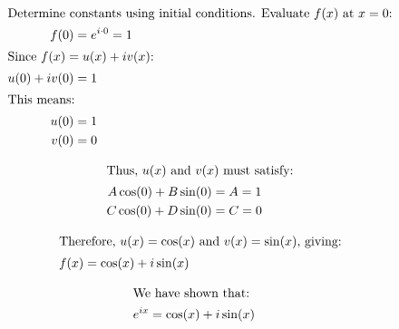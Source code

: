 \begin{align*}
\intertext{Determine constants using initial conditions. Evaluate \( f(x) \) at \( x = 0 \):}
f(0) &= e^{i \cdot 0} = 1 \\
\intertext{Since \( f(x) = u(x) + iv(x) \):}
u(0) + iv(0) &= 1 \\
\intertext{This means:}
u(0) &= 1 \\
v(0) &= 0
\end{align*}

\begin{align*}
\intertext{Thus, \( u(x) \) and \( v(x) \) must satisfy:}
A\cos(0) + B\sin(0) &= A = 1 \\
C\cos(0) + D\sin(0) &= C = 0
\end{align*}

\begin{align*}
\intertext{Therefore, \( u(x) = \cos(x) \) and \( v(x) = \sin(x) \), giving:}
f(x) &= \cos(x) + i\sin(x)
\end{align*}

\begin{align*}
\intertext{We have shown that:}
e^{ix} &= \cos(x) + i\sin(x)
\end{align*}